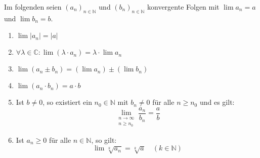 Im folgenden seien $(a_n)_{n \in \mathbb{N}}$ und $(b_n)_{n \in \mathbb{N}}$ konvergente Folgen mit $\lim a_n = a$ und $\lim b_n = b$.
\begin{enumerate}
    \item $\lim |a_n| = |a|$
    \item $\forall \lambda \in \mathbb{C}: \lim (\lambda \cdot a_n) = \lambda \cdot \lim a_n$
    \item $\lim(a_n \pm b_n) = (\lim a_n) \pm (\lim b_n)$
    \item $\lim(a_n \cdot b_n) = a \cdot b$
    \item Ist $b \neq 0$, so existiert ein $n_0 \in \mathbb{N}$ mit $b_n \neq 0$ für alle $n \geq n_0$ und es gilt:
    $$\lim_{\substack{n \to \infty \\ n \geq n_0}} \frac{a_n}{b_n} = \frac{a}{b}$$
    \item Ist $a_n \geq 0$ für alle $n \in \mathbb{N}$, so gilt:
    $$\lim \sqrt[k]{a_n} = \sqrt[k]{a} \quad (k \in \mathbb{N})$$
\end{enumerate}